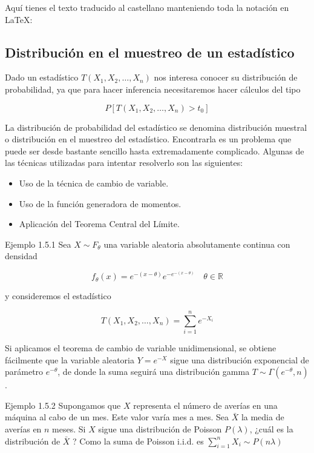 \documentclass[
]{article}
\providecommand{\tightlist}{%
  \setlength{\itemsep}{0pt}\setlength{\parskip}{0pt}}
\begin{document}
Aquí tienes el texto traducido al castellano manteniendo toda la notación en LaTeX:

\subsection{Distribución en el muestreo de un estadístico}\label{distribuciuxf3n-en-el-muestreo-de-un-estaduxedstico}

Dado un estadístico \(T\left(X_{1}, X_{2}, \ldots, X_{n}\right)\) nos interesa conocer su distribución de probabilidad, ya que para hacer inferencia necesitaremos hacer cálculos del tipo

\[
P\left[T\left(X_{1}, X_{2}, \ldots, X_{n}\right)>t_{0}\right]
\]

La distribución de probabilidad del estadístico se denomina distribución muestral o distribución en el muestreo del estadístico. Encontrarla es un problema que puede ser desde bastante sencillo hasta extremadamente complicado. Algunas de las técnicas utilizadas para intentar resolverlo son las siguientes:

\begin{itemize}
\tightlist
\item
  Uso de la técnica de cambio de variable.
\item
  Uso de la función generadora de momentos.
\item
  Aplicación del Teorema Central del Límite.
\end{itemize}

Ejemplo 1.5.1 Sea \(X \sim F_{\theta}\) una variable aleatoria absolutamente continua con densidad

\[
f_{\theta}(x)=e^{-(x-\theta)} e^{-e^{-(x-\theta)}} \quad \theta \in \mathbb{R}
\]

y consideremos el estadístico

\[
T\left(X_{1}, X_{2}, \ldots, X_{n}\right)=\sum_{i=1}^{n} e^{-X_{i}}
\]

Si aplicamos el teorema de cambio de variable unidimensional, se obtiene fácilmente que la variable aleatoria \(Y=e^{-X}\) sigue una distribución exponencial de parámetro \(e^{-\theta}\), de donde la suma seguirá una distribución gamma \(T \sim \Gamma\left(e^{-\theta}, n\right)\).

Ejemplo 1.5.2 Supongamos que \(X\) representa el número de averías en una máquina al cabo de un mes. Este valor varía mes a mes. Sea \(\bar{X}\) la media de averías en \(n\) meses. Si \(X\) sigue una distribución de Poisson \(P(\lambda)\), ¿cuál es la distribución de \(\bar{X}\) ?
Como la suma de Poisson i.i.d. es \(\sum_{i=1}^{n} X_{i} \sim P(n \lambda)\)
\end{document}
